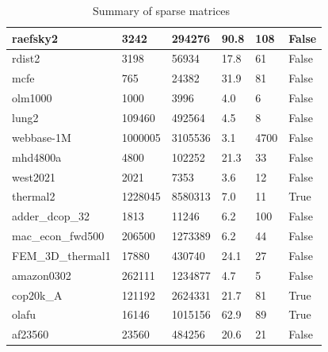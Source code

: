 \documentclass[12pt,oneside]{book} %
\begin{document}
\begin{table}[H]
\begin{tabular}{|l|l|l|l|l|l|}
        raefsky2             & 3242       & 294276      & 90.8             & 108              & False              \\ \hline
        rdist2               & 3198       & 56934       & 17.8             & 61               & False              \\ \hline
        mcfe                 & 765        & 24382       & 31.9             & 81               & False              \\ \hline
        olm1000              & 1000       & 3996        & 4.0              & 6                & False              \\ \hline
        lung2                & 109460     & 492564      & 4.5              & 8                & False              \\ \hline
        webbase-1M           & 1000005    & 3105536     & 3.1              & 4700             & False              \\ \hline
        mhd4800a             & 4800       & 102252      & 21.3             & 33               & False              \\ \hline
        west2021             & 2021       & 7353        & 3.6              & 12               & False              \\ \hline
        thermal2             & 1228045    & 8580313     & 7.0              & 11               & True               \\ \hline
        adder\_dcop\_32      & 1813       & 11246       & 6.2              & 100              & False              \\ \hline
        mac\_econ\_fwd500    & 206500     & 1273389     & 6.2              & 44               & False              \\ \hline
        FEM\_3D\_thermal1    & 17880      & 430740      & 24.1             & 27               & False              \\ \hline
        amazon0302           & 262111     & 1234877     & 4.7              & 5                & False              \\ \hline
        cop20k\_A            & 121192     & 2624331     & 21.7             & 81               & True               \\ \hline
        olafu                & 16146      & 1015156     & 62.9             & 89               & True               \\ \hline
        af23560              & 23560      & 484256      & 20.6             & 21               & False              \\ \hline
    \end{tabular}
    \caption{Summary of sparse matrices~\cite{10.1145/3017994}}
    \label{tab:matrix_summary}
\end{table}
\end{document}
